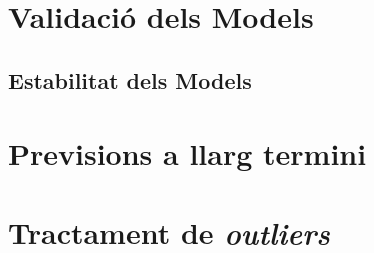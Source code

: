\documentclass[]{article}
\begin{document}
\section{Validació dels Models}\label{validacio-dels-models}

\subsection{Estabilitat dels Models}\label{estabilitat-dels-models}

\section{Previsions a llarg termini}\label{previsions-a-llarg-termini}

\section{\texorpdfstring{Tractament de
\emph{outliers}}{Tractament de outliers}}\label{tractament-de-outliers}
\end{document}
